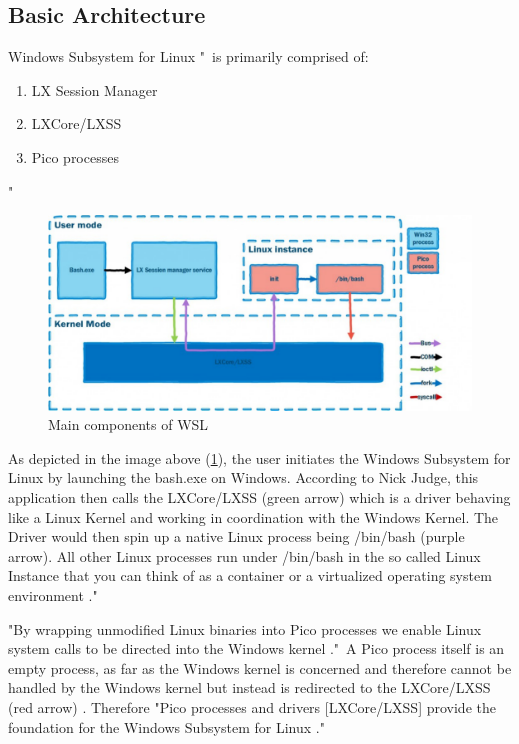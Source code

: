 \documentclass[utf8,biblatex, ngerman, english]{lni}
\begin{document}
\subsection{Basic Architecture}



Windows Subsystem for Linux "\ is primarily comprised of: 
\begin{enumerate}
    \item LX Session Manager
    \item LXCore/LXSS
    \item Pico processes
\end{enumerate} \cite{Ha16b}"

\begin{figure}
  \centering
  \includegraphics[width=1\textwidth]{WSL Architecture.pdf}
  \caption{Main components of WSL \cite{Ha16b}}
  \label{img:architecture}
\end{figure}

As depicted in the image above (\ref{img:architecture}), the user initiates the Windows Subsystem for Linux by launching the bash.exe on Windows. According to Nick Judge, this application then calls the LXCore/LXSS (green arrow) which is a driver behaving like a Linux Kernel and working in coordination with the Windows Kernel. The Driver would then spin up a native Linux process being /bin/bash (purple arrow). All other Linux processes run under /bin/bash in the so called Linux Instance that you can think of as a container or a virtualized operating system environment \cite{Ha16a}."

"By wrapping unmodified Linux binaries into Pico processes we enable Linux system calls to be directed into the Windows kernel \cite{Ha16b}."\ A Pico process itself is an empty process, as far as the Windows kernel is concerned and therefore cannot be handled by the Windows kernel but instead is redirected to the LXCore/LXSS (red arrow) \cite{Ha16a}.
Therefore "Pico processes and drivers [LXCore/LXSS] provide the foundation for the Windows Subsystem for Linux \cite{Ha16b}."
\end{document}
